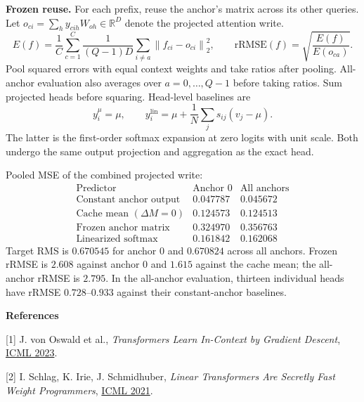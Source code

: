 \documentclass[10pt,a4paper]{article}
\newcommand{\R}{\mathbb R}
\newcommand{\ddM}{\Delta M}
\newcommand{\norm}[1]{\left\lVert#1\right\rVert}
\begin{document}
\textbf{Frozen reuse.}
For each prefix, reuse the anchor's matrix across its other queries.
Let
$o_{ci}=\sum_h y_{cih}W_{oh}\in\R^D$ denote the projected attention write.
\begin{equation}
E(f)=\frac1C\sum_{c=1}^C\frac1{(Q-1)D}\sum_{i\ne a}
\norm{f_{ci}-o_{ci}}_2^2,\qquad
\mathrm{rRMSE}(f)=\sqrt{\frac{E(f)}{E(o_{ca})}}.
\label{eq:metrics}
\end{equation}
Pool squared errors with equal context weights and take ratios after pooling.
All-anchor evaluation also averages over $a=0,\ldots,Q-1$ before taking ratios.
Sum projected heads before squaring. Head-level baselines are
\begin{equation}
y_i^{\mu}=\mu,\qquad
y_i^{\mathrm{lin}}=\mu+\frac1N\sum_j s_{ij}(v_j-\mu).
\label{eq:baselines}
\end{equation}
The latter is the first-order softmax expansion at zero logits with unit scale.
Both undergo the same output projection and aggregation as the exact head.

Pooled MSE of the combined projected write:
\begin{equation*}
\begin{array}{lrr}
\text{Predictor} & \text{Anchor }0 & \text{All anchors}\\
\text{Constant anchor output} & 0.047787 & 0.045672\\
\text{Cache mean }(\ddM=0) & 0.124573 & 0.124513\\
\text{Frozen anchor matrix} & 0.324970 & 0.356763\\
\text{Linearized softmax} & 0.161842 & 0.162068
\end{array}
\end{equation*}
Target RMS is $0.670545$ for anchor $0$ and $0.670824$ across all anchors.
Frozen rRMSE is $2.608$ against anchor $0$ and $1.615$ against the cache mean;
the all-anchor rRMSE is $2.795$. In the all-anchor evaluation, thirteen individual
heads have rRMSE $0.728$--$0.933$ against their constant-anchor baselines.

\medskip
\textbf{References}

{\footnotesize [1] J. von Oswald et al., \emph{Transformers Learn In-Context by Gradient
Descent}, \href{https://proceedings.mlr.press/v202/von-oswald23a.html}{ICML 2023}.}

{\footnotesize [2] I. Schlag, K. Irie, J. Schmidhuber, \emph{Linear Transformers Are Secretly Fast
Weight Programmers}, \href{https://proceedings.mlr.press/v139/schlag21a.html}{ICML 2021}.}
\end{document}
